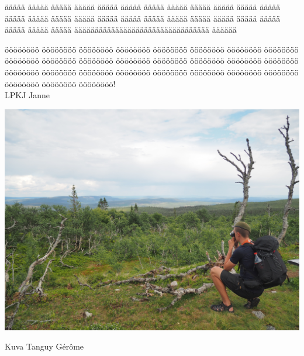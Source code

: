 \documentclass[10pt,finnish,a5paper,headings=small,twoside=semi]{scrartcl}
\begin{document}


\noindent äääää äääää äääää äääää äääää äääää äääää äääää äääää äääää äääää äääää äääää äääää äääää äääää äääää äääää äääää äääää äääää äääää äääää äääää äääää äääää äääää äääääääääääääääääääääääääääääääää ääääää

öööööööö öööööööö öööööööö öööööööö öööööööö öööööööö öööööööö öööööööö öööööööö öööööööö öööööööö öööööööö öööööööö öööööööö öööööööö öööööööö öööööööö öööööööö öööööööö öööööööö öööööööö öööööööö öööööööö öööööööö öööööööö öööööööö öööööööö! \\

\noindent LPKJ Janne

\medskip
\noindent\includegraphics[width=\linewidth]{lpkjtervehdys}

\medskip
\noindent Kuva Tanguy Gérôme

\end{document}
